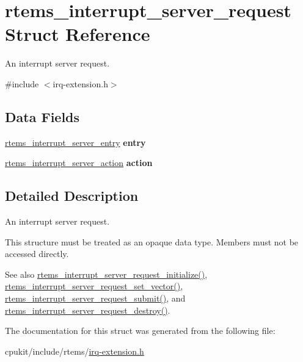 \hypertarget{structrtems__interrupt__server__request}{}\section{rtems\+\_\+interrupt\+\_\+server\+\_\+request Struct Reference}
\label{structrtems__interrupt__server__request}


An interrupt server request.  




{\ttfamily \#include $<$irq-\/extension.\+h$>$}

\subsection*{Data Fields}
\begin{DoxyCompactItemize}
\item 
\mbox{\label{structrtems__interrupt__server__request_aab0fc57521cf925a2616f040dc211d71}} 
\mbox{\hyperlink{structrtems__interrupt__server__entry}{rtems\+\_\+interrupt\+\_\+server\+\_\+entry}} {\bfseries entry}
\item 
\mbox{\label{structrtems__interrupt__server__request_a0470193fd9c3ca11e8ff19f4e52b2f19}} 
\mbox{\hyperlink{structrtems__interrupt__server__action}{rtems\+\_\+interrupt\+\_\+server\+\_\+action}} {\bfseries action}
\end{DoxyCompactItemize}


\subsection{Detailed Description}
An interrupt server request. 

This structure must be treated as an opaque data type. Members must not be accessed directly.

\begin{DoxySeeAlso}{See also}
\mbox{\hyperlink{group__rtems__interrupt__extension_ga6cd3744454ee6cbaf6aa77ba3e6d956d}{rtems\+\_\+interrupt\+\_\+server\+\_\+request\+\_\+initialize()}}, \mbox{\hyperlink{group__rtems__interrupt__extension_gabdace0e27d0d7771f58d8471284e512d}{rtems\+\_\+interrupt\+\_\+server\+\_\+request\+\_\+set\+\_\+vector()}}, \mbox{\hyperlink{group__rtems__interrupt__extension_ga8559c103b6e77d0fca7626ee20ee4efa}{rtems\+\_\+interrupt\+\_\+server\+\_\+request\+\_\+submit()}}, and \mbox{\hyperlink{group__rtems__interrupt__extension_ga214d16550a77f48cfb461afd9e7d2006}{rtems\+\_\+interrupt\+\_\+server\+\_\+request\+\_\+destroy()}}. 
\end{DoxySeeAlso}


The documentation for this struct was generated from the following file\+:\begin{DoxyCompactItemize}
\item 
cpukit/include/rtems/\mbox{\hyperlink{irq-extension_8h}{irq-\/extension.\+h}}\end{DoxyCompactItemize}
